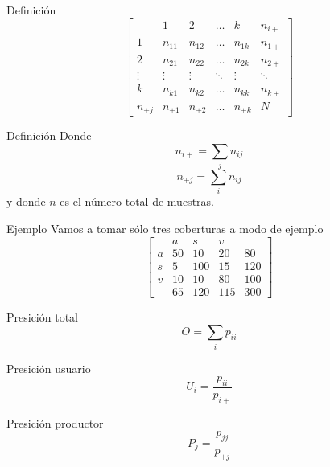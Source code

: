 \documentclass[]{beamer}
\begin{document}
\begin{frame}{\subsecname}
\begin{block}{Definición}
\[
\begin{bmatrix}
      & 1               & 2           &  \dots     & k      &  n_{i+}\\
    1 & n_{11}          & n_{12}      & \dots & n_{1k} &  n_{1+}\\
    2 & n_{21}          & n_{22} & \dots & n_{2k} &  n_{2+}\\
    \vdots  & \vdots & \vdots & \ddots      & \vdots         &  \ddots\\
    k & n_{k1} & n_{k2} & \dots       & n_{kk}       &  n_{k+}\\
    n_{+j} & n_{+1} & n_{+2} & \dots & n_{+k} & N
\end{bmatrix} \]
\end{block}
\end{frame}

\begin{frame}{\subsecname}
\begin{block}{Definición}
  Donde
  $$n_{i+} = \sum_j n_{ij}$$
  $$n_{+j} = \sum_i n_{ij}$$
  y donde $n$ es el número total de muestras.
\end{block}
\end{frame}

\begin{frame}{\subsecname}
  \begin{exampleblock}{Ejemplo}
    Vamos a tomar sólo tres coberturas a modo de ejemplo
    \[
    \begin{bmatrix}
          & a   & s    & v  & \\
        a & 50  & 10   & 20 & 80 \\
        s & 5   & 100  & 15 & 120 \\
        v & 10  & 10   & 80 & 100 \\
          & 65  & 120  & 115& 300
    \end{bmatrix} \]
  \end{exampleblock}
\end{frame}

\begin{frame}{\subsecname}
  \begin{block}{Presición total}
    $$O = \sum_i p_{ii}$$
  \end{block}\pause
  \begin{block}{Presición usuario}
    $$U_i = \frac{p_{ii}}{p_{i+}}$$
  \end{block}\pause
  \begin{block}{Presición productor}
    $$P_j = \frac{p_{jj}}{p_{+j}}$$
  \end{block}  \pause
\end{frame}
\end{document}
